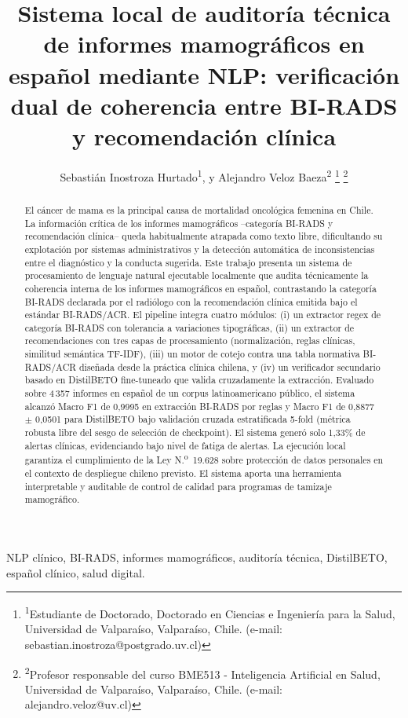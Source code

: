 \documentclass[10pt,journal,a4paper]{IEEEtran}
\title{Sistema local de auditor\'ia t\'ecnica de informes mamogr\'aficos en espa\~nol mediante NLP: verificaci\'on dual de coherencia entre BI-RADS y recomendaci\'on cl\'inica}
\author{
    Sebasti\'an Inostroza Hurtado\textsuperscript{1}, y Alejandro Veloz Baeza\textsuperscript{2}
    \thanks{\textsuperscript{1}Estudiante de Doctorado, Doctorado en Ciencias e Ingenier\'ia para la Salud, Universidad de Valpara\'iso, Valpara\'iso, Chile. (e-mail: sebastian.inostroza@postgrado.uv.cl)}
    \thanks{\textsuperscript{2}Profesor responsable del curso BME513 - Inteligencia Artificial en Salud, Universidad de Valpara\'iso, Valpara\'iso, Chile. (e-mail: alejandro.veloz@uv.cl)}
}
\begin{document}
\maketitle

\begin{abstract}
El c\'ancer de mama es la principal causa de mortalidad oncol\'ogica femenina en Chile. La informaci\'on cr\'itica de los informes mamogr\'aficos --categor\'ia BI-RADS y recomendaci\'on cl\'inica-- queda habitualmente atrapada como texto libre, dificultando su explotaci\'on por sistemas administrativos y la detecci\'on autom\'atica de inconsistencias entre el diagn\'ostico y la conducta sugerida. Este trabajo presenta un sistema de procesamiento de lenguaje natural ejecutable localmente que audita t\'ecnicamente la coherencia interna de los informes mamogr\'aficos en espa\~nol, contrastando la categor\'ia BI-RADS declarada por el radi\'ologo con la recomendaci\'on cl\'inica emitida bajo el est\'andar BI-RADS/ACR. El pipeline integra cuatro m\'odulos: (i) un extractor regex de categor\'ia BI-RADS con tolerancia a variaciones tipogr\'aficas, (ii) un extractor de recomendaciones con tres capas de procesamiento (normalizaci\'on, reglas cl\'inicas, similitud sem\'antica TF-IDF), (iii) un motor de cotejo contra una tabla normativa BI-RADS/ACR dise\~nada desde la pr\'actica cl\'inica chilena, y (iv) un verificador secundario basado en DistilBETO fine-tuneado que valida cruzadamente la extracci\'on. Evaluado sobre 4\,357 informes en espa\~nol de un corpus latinoamericano p\'ublico, el sistema alcanz\'o Macro F1 de 0,9995 en extracci\'on BI-RADS por reglas y Macro F1 de 0,8877 $\pm$ 0,0501 para DistilBETO bajo validaci\'on cruzada estratificada 5-fold (m\'etrica robusta libre del sesgo de selecci\'on de checkpoint). El sistema gener\'o solo 1,33\% de alertas cl\'inicas, evidenciando bajo nivel de fatiga de alertas. La ejecuci\'on local garantiza el cumplimiento de la Ley N.\textsuperscript{o}~19.628 sobre protecci\'on de datos personales en el contexto de despliegue chileno previsto. El sistema aporta una herramienta interpretable y auditable de control de calidad para programas de tamizaje mamogr\'afico.
\end{abstract}

\begin{IEEEkeywords}
NLP cl\'inico, BI-RADS, informes mamogr\'aficos, auditor\'ia t\'ecnica, DistilBETO, espa\~nol cl\'inico, salud digital.
\end{IEEEkeywords}
\end{document}
